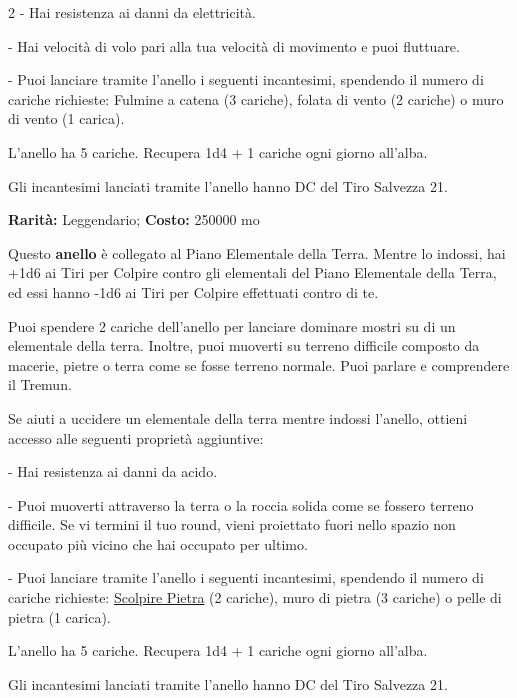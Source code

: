 \begin{multicols}{2}
\smallskip- Hai resistenza ai danni da elettricità.

\smallskip- Hai velocità di volo pari alla tua velocità di movimento e puoi fluttuare.

\smallskip- Puoi lanciare tramite l'anello i seguenti incantesimi, spendendo il numero di cariche richieste: Fulmine a catena (3 cariche), folata di vento (2 cariche) o muro di vento (1 carica).

\medskip

L'anello ha 5 cariche. Recupera 1d4 + 1 cariche ogni giorno all'alba.

Gli incantesimi lanciati tramite l'anello hanno DC del Tiro Salvezza 21.


\textbf{Rarità:} Leggendario; \textbf{Costo:} 250000 mo

Questo \textbf{anello} è collegato al Piano Elementale della Terra. Mentre lo indossi, hai +1d6 ai Tiri per Colpire contro gli elementali del Piano Elementale della Terra, ed essi hanno -1d6 ai Tiri per Colpire effettuati contro di te.

Puoi spendere 2 cariche dell'anello per lanciare dominare mostri su di un elementale della terra. Inoltre, puoi muoverti su terreno difficile composto da macerie, pietre o terra come se fosse terreno normale. Puoi parlare e comprendere il Tremun.

Se aiuti a uccidere un elementale della terra mentre indossi l'anello, ottieni accesso alle seguenti proprietà aggiuntive:

\smallskip- Hai resistenza ai danni da acido.

\smallskip- Puoi muoverti attraverso la terra o la roccia solida come se fossero terreno difficile. Se vi termini il tuo round, vieni proiettato fuori nello spazio non occupato più vicino che hai occupato per ultimo.

\smallskip- Puoi lanciare tramite l'anello i seguenti incantesimi, spendendo il numero di cariche richieste: \hyperlink{Scolpire Pietra}{Scolpire Pietra} (2 cariche), muro di pietra (3 cariche) o pelle di pietra (1 carica).

\medskip

L'anello ha 5 cariche. Recupera 1d4 + 1 cariche ogni giorno all'alba.

Gli incantesimi lanciati tramite l'anello hanno DC del Tiro Salvezza 21.



\end{multicols}
